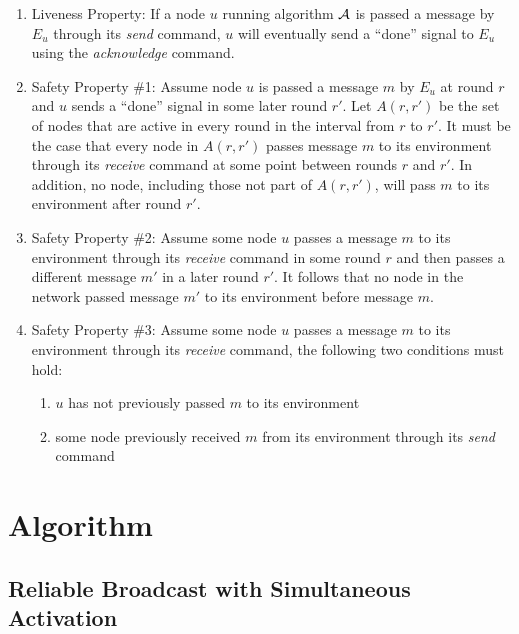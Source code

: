 \documentclass[english]{article}
\begin{document}
\begin {enumerate}
 
  \item Liveness Property: If a node $u$ running algorithm $\cal A$ is passed a message by $E_u$ through its \textit{send} command, $u$ will eventually send  a ``done'' signal to $E_u$ using the \textit{acknowledge} command.

  \item Safety Property \#1: Assume node $u$ is passed a message $m$ by $E_u$ at round $r$ and $u$ sends  a ``done'' signal in some later round $r'$. Let $A(r,r')$ be the set of nodes that are active in every round in the interval from $r$ to $r'$. It must be the case that every node in $A(r,r')$ passes message $m$ to its environment through its \textit{receive} command at some point between rounds $r$ and $r'$. In addition, no node, including those not part of $A(r,r')$, will pass $m$ to its environment after round $r'$. 

  \item Safety Property \#2: Assume some node $u$ passes a message $m$ to its environment through its \textit{receive} command in some round $r$ and then passes a different message $m'$ in a later round $r'$. It follows that no node in the network passed message $m'$ to its environment before message $m$. 

  \item Safety Property \#3: Assume some node $u$ passes a message $m$ to its environment through its \textit{receive} command, the following two conditions must hold:
  \begin {enumerate}
    \item $u$ has not previously passed $m$ to its environment
    \item some node previously received $m$ from its environment through its \textit{send} command
  \end{enumerate}

\end{enumerate}


\section{Algorithm}

  \subsection {Reliable Broadcast with Simultaneous Activation}
\end{document}
